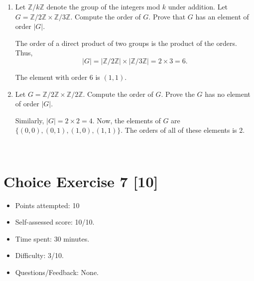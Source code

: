 \documentclass{article}
\begin{document}
\begin{enumerate}
{\begin{enumerate}
{\begin{enumerate}
{                Now, given \(G_1\) and \(G_2\) are abelian, reverse the above 
                algebra to see that \(G\) must also be abelian. Thus, 
                \(G_1 \times G_2\) is abelian if and only if \(G_1\) and \(G_2\) 
                are both abelian.

            }

            \item {
                Let \(\mathbb{Z}/k\mathbb{Z}\) denote the group of the integers mod \(k\) under addition. Let \(G = \mathbb{Z}/2\mathbb{Z} \times \mathbb{Z}/3\mathbb{Z}\). Compute the order of \(G\). Prove that \(G\) has an element of order \(|G|\).
        
                The order of a direct product of two groups is the product of the 
                orders. Thus,
                \[|G| = |\mathbb{Z}/2\mathbb{Z}| \times |\mathbb{Z}/3\mathbb{Z}| = 2 \times 3 = 6.\]

                The element with order 6 is \((1,1)\).
            }

            \item {
                Let \(G = \mathbb{Z}/2\mathbb{Z} \times \mathbb{Z}/2\mathbb{Z}\). 
                Compute the order of \(G\). Prove the \(G\) has no element of order \(|G|\).

                Similarly, \(|G| = 2 \times 2 = 4\). Now, the elements of \(G\) 
                are \(\{ (0,0), (0,1), (1,0), (1,1)  \}\). The orders of all of these 
                elements is \(2\).
            }
        \end{enumerate}
    }
\end{enumerate}
\
    }
\end{enumerate}
\pagebreak


\section*{Choice Exercise 7 [10]}
\begin{itemize}
  \item Points attempted: 10
  \item Self-assessed score: 10/10.
  \item Time spent: 30 minutes.
  \item Difficulty: 3/10.
  \item Questions/Feedback: None.
\end{itemize}
\end{document}
